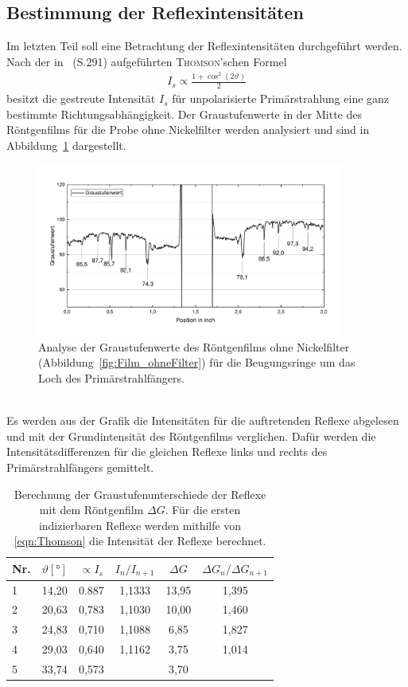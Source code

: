\documentclass[a4paper,twoside,final]{article}
\begin{document}
\subsection{Bestimmung der Reflexintensitäten}
Im letzten Teil soll eine Betrachtung der Reflexintensitäten durchgeführt werden. Nach der in~\cite{Glocker} (S.291) aufgeführten \textsc{Thomson}'schen Formel
\begin{align}
  I_s \propto \frac{1+\cos^2(2\vartheta)}{2}\label{eqn:Thomson}
\end{align}
besitzt die gestreute Intensität $I_s$ für unpolarisierte Primärstrahlung eine ganz bestimmte Richtungsabhängigkeit.
Der Graustufenwerte in der Mitte des Röntgenfilms für die Probe ohne Nickelfilter werden analysiert und sind in Abbildung~\ref{fig:Intensitaet} dargestellt.
\begin{figure}[htp]
    \centering
        \includegraphics[width=0.9\textwidth]{Abbildungen/Intensitaeten.pdf}
    \caption{Analyse der Graustufenwerte des Röntgenfilms ohne Nickelfilter (Abbildung~\ref{fig:Film_ohneFilter}) für die Beugungsringe um das Loch des Primärstrahlfängers.}
    \label{fig:Intensitaet}
\end{figure}\\
Es werden aus der Grafik die Intensitäten für die auftretenden Reflexe abgelesen und mit der Grundintensität des Röntgenfilms verglichen. Dafür werden die Intensitätsdifferenzen für die gleichen Reflexe links und rechts des Primärstrahlfängers gemittelt.
\begin{table}[ht]
	\centering
	\caption{Berechnung der Graustufenunterschiede der Reflexe mit dem Röntgenfilm $\Delta G$. Für die ersten indizierbaren Reflexe werden mithilfe von \eqref{eqn:Thomson} die Intensität der Reflexe berechnet.}
	\label{tab:Intensitäten}
	\begin{tabular}{l c c c S c}
		\toprule
      Nr. & $\vartheta [\si{\degree}]$ & $\propto I_s$ & $I_n / I_{n+1}$  & $\Delta G$ & $\Delta G_n / \Delta G_{n+1}$\\
     & 14,20 & 0.887 & 1,1333 & 13,95 & 1,395 \\
    2 & 20,63 & 0,783 & 1,1030 & 10,00 & 1,460 \\
    3 & 24,83 & 0,710 & 1,1088 & 6,85  & 1,827\\
    4 & 29,03 & 0,640 & 1,1162 & 3,75  & 1,014 \\
    5 & 33,74 & 0,573 &        & 3,70  &
	\end{tabular}
\end{table}\\
\end{document}
